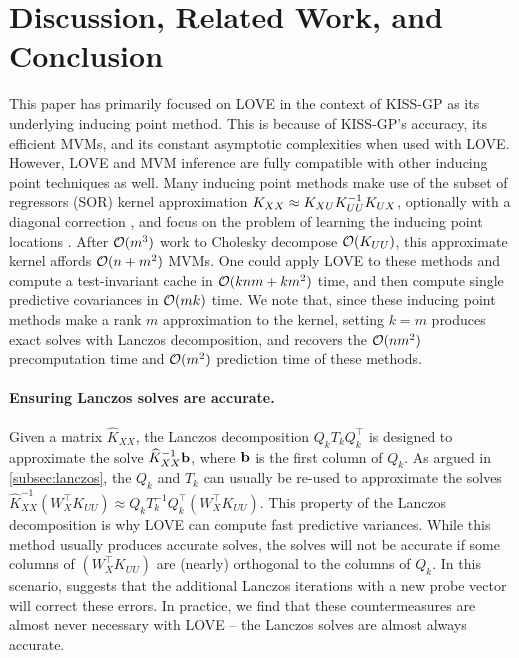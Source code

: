\section{Discussion, Related Work, and Conclusion}
\label{sec:love_discussion}

This paper has primarily focused on LOVE{} in the context of KISS-GP as its underlying inducing point method.
This is because of KISS-GP's accuracy, its efficient MVMs, and its constant asymptotic complexities when used with LOVE{}.
However, LOVE and MVM inference are fully compatible with other inducing point techniques as well. Many inducing point methods make use of the subset of regressors (SOR) kernel approximation $K_{XX} \approx
K_{XU}K_{UU}^{-1}K_{UX}$, optionally with a diagonal correction \cite{snelson2006sparse}, and focus on the problem of learning the
inducing point locations \cite{quinonero2005unifying,titsias2009variational}. After $\bigo{m^{3}}$ work to Cholesky decompose
$\bigo{\bK_{UU}}$, this approximate kernel affords $\bigo{n + m^{2}}$ MVMs. One could apply LOVE to these methods and
compute a test-invariant cache in $\bigo{knm+km^{2}}$ time, and then compute single predictive covariances in $\bigo{mk}$ time.
We note that, since these inducing point methods make a rank $m$ approximation to the kernel, setting $k\!=\!m$ produces exact solves with Lanczos decomposition, and recovers the $\bigo{nm^{2}}$ precomputation time and $\bigo{m^2}$ prediction time of these methods.

\paragraph{Ensuring Lanczos solves are accurate.}
Given a matrix $\widehat K_{XX}$, the Lanczos decomposition $Q_k T_k Q_k^\top$ is designed to approximate the solve $\widehat K_{XX}^{-1} \mathbf{b}$, where $\mathbf{b}$ is the first column of $Q_k$.
As argued in \autoref{subsec:lanczos}, the $Q_k$ and $T_k$ can usually be re-used to approximate the solves $\widehat K_{XX}^{-1} (W_X^\top K_{UU}) \approx Q_k T_k^{-1} Q_k^\top (W_X^\top K_{UU})$.
This property of the Lanczos decomposition is why LOVE{} can compute fast predictive variances.
While this method usually produces accurate solves, the solves will not be accurate if some columns of $(W^\top_X K_{UU})$ are (nearly) orthogonal to the columns of $Q_k$.
In this scenario, \citet{saad1987lanczos} suggests that the additional Lanczos iterations with a new probe vector will correct these errors.
In practice, we find that these countermeasures are almost never necessary with LOVE{} -- the Lanczos solves are almost always accurate.

